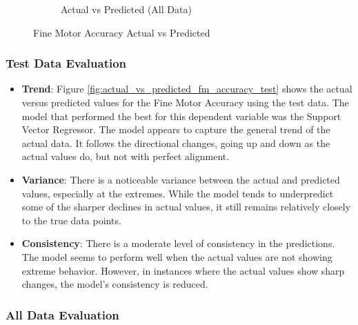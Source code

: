 \begin{figure}[htbp]
\begin{subfigure}[b]{0.49\textwidth}
        \caption{Actual vs Predicted (All Data)}
        \label{fig:actual_vs_predicted_fm_accuracy_all_data}
    \end{subfigure}
    \caption{Fine Motor Accuracy Actual vs Predicted}
    \label{fig:fine_motor_accuracy_comparison}
\end{figure}

\subsubsection*{Test Data Evaluation}

\begin{itemize}
    \item \textbf{Trend}: Figure \ref{fig:actual_vs_predicted_fm_accuracy_test} shows the actual versus predicted values for the Fine Motor Accuracy using the test data. The model 
    that performed the best for this dependent variable was the Support Vector Regressor. The model appears to capture the general trend of the actual data. It follows the directional
    changes, going up and down as the actual values do, but not with perfect alignment.
    \item \textbf{Variance}: There is a noticeable variance between the actual and predicted values, especially at the extremes. While the model tends to underpredict some of the sharper
    declines in actual values, it still remains relatively closely to the true data points.
    \item \textbf{Consistency}: There is a moderate level of consistency in the predictions. The model seems to perform well when the actual values are not showing extreme behavior. However,
    in instances where the actual values show sharp changes, the model's consistency is reduced.
\end{itemize}

\subsubsection*{All Data Evaluation}

